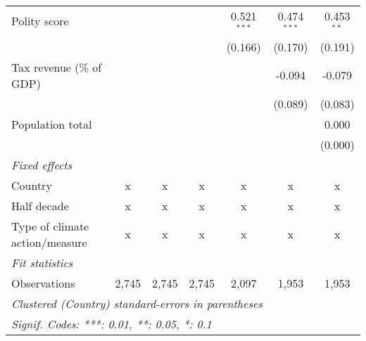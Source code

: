 \begin{tabular}{lcccccc}
   Polity score                                                           &              &         &                & 0.521$^{***}$  & 0.474$^{***}$  & 0.453$^{**}$\\   
                                                                          &              &         &                & (0.166)        & (0.170)        & (0.191)\\   
   Tax revenue (\% of GDP)                                                &              &         &                &                & -0.094         & -0.079\\   
                                                                          &              &         &                &                & (0.089)        & (0.083)\\   
   Population total                                                       &              &         &                &                &                & 0.000\\   
                                                                          &              &         &                &                &                & (0.000)\\   
   \emph{Fixed effects}\\
   Country                                                                & x            & x       & x              & x              & x              & x\\  
   Half decade                                                            & x            & x       & x              & x              & x              & x\\  
   Type of climate action/measure                                         & x            & x       & x              & x              & x              & x\\  
   \midrule \emph{Fit statistics}\\
   Observations                                                           & 2,745        & 2,745   & 2,745          & 2,097          & 1,953          & 1,953\\  
   \midrule
   \multicolumn{7}{l}{\emph{Clustered (Country) standard-errors in parentheses}}\\
   \multicolumn{7}{l}{\emph{Signif. Codes: ***: 0.01, **: 0.05, *: 0.1}}\\
\end{tabular}
\par\endgroup


